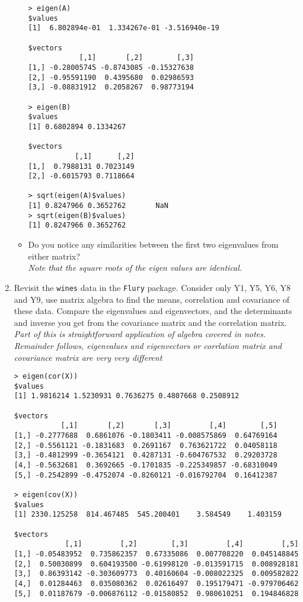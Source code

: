 \documentclass{article}
\begin{document}
\begin{enumerate}
\begin{itemize}
\begin{verbatim}
> eigen(A)
$values
[1]  6.802894e-01  1.334267e-01 -3.516940e-19

$vectors
            [,1]       [,2]        [,3]
[1,] -0.28005745 -0.8743085 -0.15327638
[2,] -0.95591190  0.4395680  0.02986593
[3,] -0.08831912  0.2058267  0.98773194

> eigen(B)
$values
[1] 0.6802894 0.1334267

$vectors
           [,1]      [,2]
[1,]  0.7988131 0.7023149
[2,] -0.6015793 0.7118664

> sqrt(eigen(A)$values)
[1] 0.8247966 0.3652762       NaN
> sqrt(eigen(B)$values)
[1] 0.8247966 0.3652762
\end{verbatim}

\item Do you notice any similarities between the first two eigenvalues from either matrix?\\
\textit{Note that the square roots of the eigen values are identical.}
\end{itemize}

\item Revisit the \texttt{wines} data in the \texttt{Flury} package.   Consider only Y1, Y5, Y6, Y8 and Y9, use matrix algebra to find the means, correlation and covariance of these data.   Compare the eigenvalues and eigenvectors, and the determinants and inverse you get from the covariance matrix and the correlation matrix.\\
\textit{Part of this is straightforward application of algebra covered in notes.   Remainder follows, eigenvalues and eigenvectors or corrlation matrix and covariance matrix are very very different}

\begin{verbatim}
> eigen(cor(X))
$values
[1] 1.9816214 1.5230931 0.7636275 0.4807668 0.2508912

$vectors
           [,1]       [,2]       [,3]         [,4]        [,5]
[1,] -0.2777688  0.6861076 -0.1803411 -0.008575869  0.64769164
[2,] -0.5561121 -0.1831683  0.2691167  0.763621722  0.04058118
[3,] -0.4812999 -0.3654121  0.4287131 -0.604767532  0.29203728
[4,] -0.5632681  0.3692665 -0.1701835 -0.225349857 -0.68310049
[5,] -0.2542899 -0.4752074 -0.8260121 -0.016792704  0.16412387

> eigen(cov(X))
$values
[1] 2330.125258  814.467485  545.200401    3.584549    1.403159

$vectors
            [,1]         [,2]        [,3]         [,4]         [,5]
[1,] -0.05483952  0.735862357  0.67335086  0.007708220  0.045148845
[2,]  0.50030899  0.604193500 -0.61998120 -0.013591715  0.008928181
[3,]  0.86393142 -0.303609773  0.40160604 -0.008022325  0.009582822
[4,]  0.01284463  0.035080362  0.02616497  0.195179471 -0.979706462
[5,]  0.01187679 -0.006876112 -0.01580852  0.980610251  0.194846828
\end{verbatim}


\end{enumerate}
\end{document}
